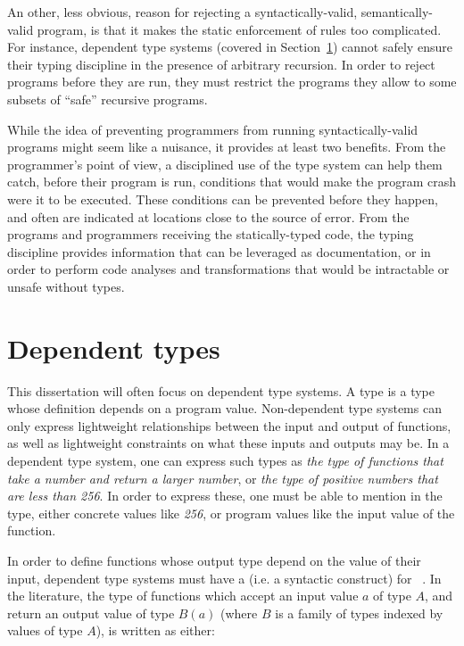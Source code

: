An other, less obvious, reason for rejecting a syntactically-valid,
semantically-valid program, is that it makes the static enforcement of rules too
complicated.  For instance, dependent type systems (covered
in Section~\ref{dependent-types}) cannot safely ensure their typing discipline in the
presence of arbitrary recursion.  In order to reject programs before they are
run, they must restrict the programs they allow to some subsets of ``safe''
recursive programs.

While the idea of preventing programmers from running syntactically-valid
programs might seem like a nuisance, it provides at least two benefits.  From
the programmer's point of view, a disciplined use of the type system can help
them catch, before their program is run, conditions that would make the program
crash were it to be executed.  These conditions can be prevented before they
happen, and often are indicated at locations close to the source of error.  From
the programs and programmers receiving the statically-typed code, the typing
discipline provides information that can be leveraged as documentation, or in
order to perform code analyses and transformations that would be intractable or
unsafe without types.

\section{Dependent types}
\label{dependent-types}

This dissertation will often focus on dependent type systems.  A
 type is a type whose definition depends on a program value.
Non-dependent type systems can only express lightweight relationships between
the input and output of functions, as well as lightweight constraints on what
these inputs and outputs may be.  In a dependent type system, one can express
such types as \textit{the type of functions that take a number and return a
larger number}, or \textit{the type of positive numbers that are less than 256}.
In order to express these, one must be able to mention in the type, either
concrete values like \textit{256}, or program values like the input value of the
function.

In order to define functions whose output type depend on the value of their
input, dependent type systems must have a  (i.e. a syntactic
construct) for ~\footnotemark.  In the literature,
the type of functions which accept an input value $a$ of type $A$, and return an
output value of type $B(a)$ (where $B$ is a family of types indexed by values of
type $A$), is written as either:

